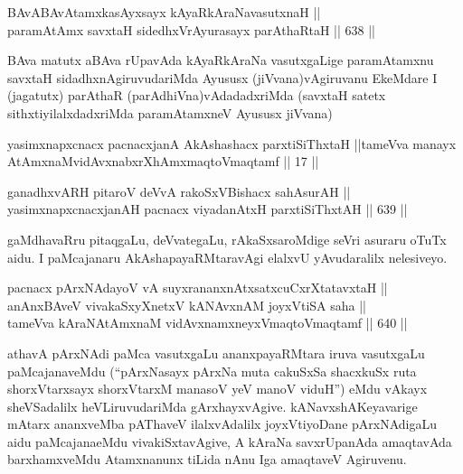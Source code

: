 
\begin{shl}
BAvABAvAtamxkasAyxsayx kAyaRkAraNavasutxnaH || \\
paramAtAmx savxtaH sidedhxVrAyurasayx parAthaRtaH \hfill || 638 ||  
\end{shl}

\begin{artha}
BAva matutx aBAva rUpavAda kAyaRkAraNa vasutxgaLige paramAtamxnu
savxtaH sidadhxnAgiruvudariMda Ayususx (jiVvana)\break vAgiruvanu EkeMdare
I (jagatutx) parAthaR (parAdhiVna)vAdadadxriMda (savxtaH satetx
sithxtiyilalxdadxriMda paramAtamxneV Ayususx jiVvana) 
\end{artha}


\begin{kandikeshl}
yasimxnapxcnacx pacnacxjanA AkAshashacx parxtiSiThxtaH ||tameVva manayx AtAmxnaM\break vidAvxnabxrXhAmxmaqtoV\s maqtamf || 17 ||
\end{kandikeshl}


\begin{shl}
ganadhxvARH pitaroV deVvA rakoSxVBishacx sahAsurAH || \\
yasimxnapxcnacxjanAH pacnacx viyadanAtxH parxtiSiThxtAH \hfill || 639 ||  
\end{shl}

\begin{artha}
gaMdhavaRru pitaqgaLu, deVvategaLu, rAkaSxsaroMdige seVri asuraru
oTuTx aidu. I paMcajanaru AkAshapayaRMtaravAgi elalxvU yAvudaralilx
nelesiveyo.
\end{artha}

\begin{shl}
pacnacx pArxNAdayoV vA suyxrananxnAtxsatxcuCxrXtatavxtaH || \\
anAnxBAveV vivakaSxyXnetxV kANAvxnAM joyxVtiSA saha || \\
tameVva kAraNAtAmxnaM vidAvxnamxneyxV\s maqtoV\s maqtamf \hfill || 640 ||  
\end{shl}

\begin{artha}
athavA pArxNAdi paMca vasutxgaLu ananxpayaRMtara iruva vasutxgaLu
paMcajanaveMdu (``pArxNasayx pArxNa muta cakuSxSa shacxkuSx ruta shorxVtarxsayx shorxVtarxM manasoV yeV manoV viduH'') eMdu vAkayx sheVSadalilx heVLiruvudariMda
gArxhayxvAgive. kANavxshAKeyavarige mAtarx ananxveMba pAThaveV
ilalxvAdalilx joyxVtiyoDane pArxNAdigaLu aidu paMcajanaeMdu
vivakiSxtavAgive, A kAraNa savxrUpanAda amaqtavAda barxhamxveMdu
Atamxnanunx tiLida nAnu Iga amaqtaveV Agiruvenu.
\end{artha}

